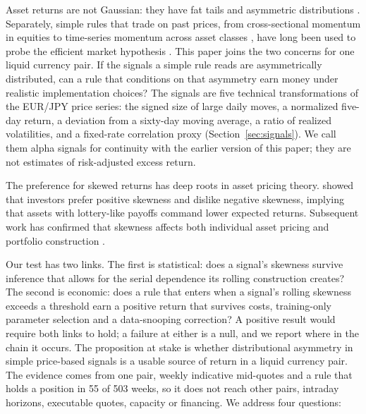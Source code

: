 \documentclass[11pt]{article}
\begin{document}
Asset returns are not Gaussian: they have fat tails \citep{mandelbrot1963variation, cont2001empirical} and asymmetric distributions \citep{harvey2000conditional}. Separately, simple rules that trade on past prices, from cross-sectional momentum in equities \citep{jegadeesh1993returns} to time-series momentum across asset classes \citep{moskowitz2012time}, have long been used to probe the efficient market hypothesis \citep{fama1970efficient}. This paper joins the two concerns for one liquid currency pair. If the signals a simple rule reads are asymmetrically distributed, can a rule that conditions on that asymmetry earn money under realistic implementation choices? The signals are five technical transformations of the EUR/JPY price series: the signed size of large daily moves, a normalized five-day return, a deviation from a sixty-day moving average, a ratio of realized volatilities, and a fixed-rate correlation proxy (Section~\ref{sec:signals}). We call them alpha signals for continuity with the earlier version of this paper; they are not estimates of risk-adjusted excess return.

The preference for skewed returns has deep roots in asset pricing theory. \citet{kraus1976skewness} showed that investors prefer positive skewness and dislike negative skewness, implying that assets with lottery-like payoffs command lower expected returns. Subsequent work has confirmed that skewness affects both individual asset pricing \citep{harvey2000conditional, bali2011maxing} and portfolio construction \citep{mitton2007equilibrium, brunnermeier2007optimal}.

Our test has two links. The first is statistical: does a signal's skewness survive inference that allows for the serial dependence its rolling construction creates? The second is economic: does a rule that enters when a signal's rolling skewness exceeds a threshold earn a positive return that survives costs, training-only parameter selection and a data-snooping correction? A positive result would require both links to hold; a failure at either is a null, and we report where in the chain it occurs. The proposition at stake is whether distributional asymmetry in simple price-based signals is a usable source of return in a liquid currency pair. The evidence comes from one pair, weekly indicative mid-quotes and a rule that holds a position in 55 of 503 weeks, so it does not reach other pairs, intraday horizons, executable quotes, capacity or financing. We address four questions:
\end{document}
